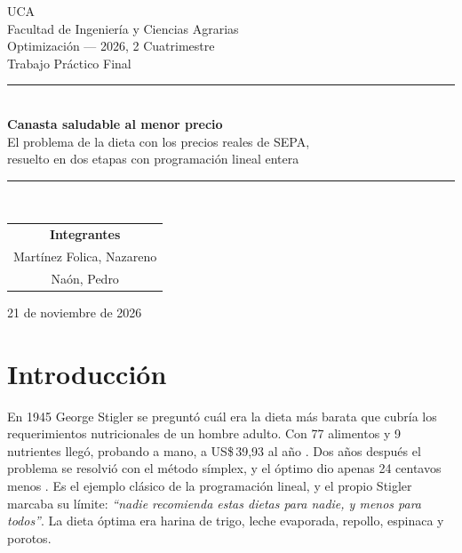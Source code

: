 \documentclass[10pt,a4paper]{article}
\newcommand{\cita}[1]{\emph{``#1''}}
\begin{document}
\begin{titlepage}
\begin{center}
\vspace*{1.2cm}
{\large UCA}\\[2pt]
{\large Facultad de Ingeniería y Ciencias Agrarias}\\[1.4cm]

{\large Optimización — 2026, 2\textdegree{} Cuatrimestre}\\[0.3cm]
{\large Trabajo Práctico Final}\\[1.8cm]

\rule{0.85\linewidth}{0.6pt}\\[0.5cm]
{\Huge\bfseries\color{accent} Canasta saludable al menor precio}\\[0.5cm]
{\Large El problema de la dieta con los precios reales de SEPA,\\
resuelto en dos etapas con programación lineal entera}\\[0.5cm]
\rule{0.85\linewidth}{0.6pt}\\[2.2cm]

\begin{tabular}{c}
{\large\bfseries Integrantes} \\[0.4cm]
{\large Martínez Folica, Nazareno} \\[0.15cm]
{\large Naón, Pedro}
\end{tabular}

\vfill

{\large 21 de noviembre de 2026}
\end{center}
\end{titlepage}

\tableofcontents
\newpage
{}

\section*{Introducción}

En 1945 George Stigler se preguntó cuál era la dieta más barata que cubría los
requerimientos nutricionales de un hombre adulto. Con 77 alimentos y 9 nutrientes
llegó, probando a mano, a US\$\,39,93 al año \cite{stigler}. Dos años después el
problema se resolvió con el método símplex, y el óptimo dio apenas 24 centavos
menos \cite{dantzig,garille}. Es el ejemplo clásico de la programación lineal, y el
propio Stigler marcaba su límite: \cita{nadie recomienda estas dietas para nadie, y
menos para todos}. La dieta óptima era harina de trigo, leche evaporada, repollo,
espinaca y porotos.
\end{document}
